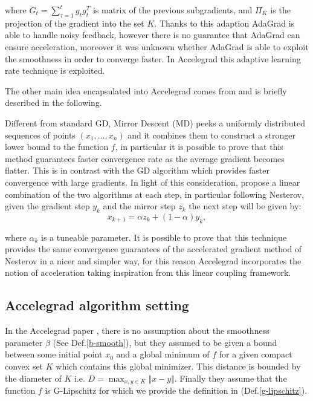 \documentclass[12pt]{article}
\theoremstyle{definition}
\begin{document}
where $G_t = \sum_{\tau=1}^t g_t g_t^T $ is matrix of the previous subgradients, and $\Pi_K$ is the projection of the gradient into the set $K$. 
Thanks to this adaption AdaGrad is able to handle noisy feedback, however there is no guarantee that AdaGrad can ensure acceleration, moreover it was unknown whether AdaGrad is able to exploit the smoothness in order to converge faster. In Accelegrad this adaptive learning rate technique is exploited. 

The other main idea encapsulated into Accelegrad comes from \cite{linearcup} and is briefly described in the following. 

Different from standard GD, Mirror Descent (MD) peeks a uniformly distributed sequences of points $(x_1,\dots,x_n)$ and it combines them to construct a stronger lower bound to the function $f$, in particular it is possible to prove that this method guarantees faster convergence rate as the average gradient becomes flatter. This is in contrast with the GD algorithm which provides faster convergence with large gradients. In light of this consideration, \cite{linearcup} propose a linear combination of the two algorithms at each step, in particular following Nesterov, given the gradient step $y_k$ and the mirror step $z_k$ the next step will be given by:
\begin{equation}
  x_{k+1} = \alpha z_k + (1-\alpha) y_k,
\end{equation}

where $\alpha_k$ is a tuneable parameter.
It is possible to prove that this technique provides the same convergence guarantees of the accelerated gradient method of Nesterov in a nicer and simpler way, for this reason Accelegrad incorporates the notion of acceleration taking inspiration from this linear coupling framework.
  
\subsection{Accelegrad algorithm setting}

In the Accelegrad paper \cite{accelegrad}, there is no assumption about the smoothness parameter $\beta$ (See Def.\ref{b-smooth}), but they assumed to be given a bound between some initial point $x_0$ and a global minimum of $f$ for a given compact convex set $K$ which contains this global minimizer. This distance is bounded by the diameter of $K$ i.e. $D = \max_{x,y \in K} \Vert x-y \Vert $. Finally they assume that the function $f$ is G-Lipschitz for which we provide the definition in (Def.\ref{g-lipschitz}).
\end{document}

